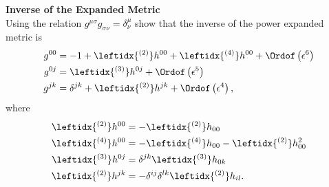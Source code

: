 \begin{exercise}
\textbf{Inverse of the Expanded Metric}\\
Using the relation $g^{\mu \sigma} g_{\sigma \nu} = \delta^\mu _\nu$ show that the inverse of the power expanded metric is
\begin{subequations}
\begin{align}
g^{00} &= -1 + \leftidx{^{(2)}}h^{00} + \leftidx{^{(4)}}h^{00} + \Ordof \left( \epsilon^6 \right) \\
g^{0j} &= \leftidx{^{(3)}}h^{0j} +  \Ordof \left( \epsilon^5 \right)  \\
g^{jk} &= \delta^{jk} + \leftidx{^{(2)}}h^{jk} + \Ordof \left( \epsilon^4 \right) ,
\end{align}
\end{subequations}
where
\begin{subequations}
\begin{align}
\leftidx{^{(2)}}h^{00} &= -  \leftidx{^{(2)}}h_{00} \\
\leftidx{^{(4)}}h^{00} &= -  \leftidx{^{(4)}}h_{00} - \leftidx{^{(2)}}h_{00}^2\\
\leftidx{^{(3)}}h^{0j} &=   \delta ^{jk} \leftidx{^{(3)}}h_{0k} \\
\leftidx{^{(2)}}h^{jk} &= - \delta ^{ij} \delta^{lk} \leftidx{^{(2)}}h_{il} .
\end{align}
\end{subequations}
\end{exercise}

